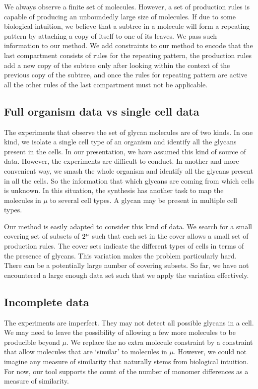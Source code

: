 We always observe a finite set of molecules. However,
a set of production rules is capable of producing
an unboundedly large size of molecules.
If due to some biological intuition, we believe that a subtree in a molecule
will form a repeating pattern by attaching a copy of itself to
one of its leaves.
We pass such information to our method.
We add constraints to our method to encode that
the last compartment consists of rules for the repeating pattern,
the production rules add a new copy of the subtree only after looking
within the context of the previous copy of the subtree,
and once the rules for repeating pattern are active
all the other rules of the last compartment must not be applicable. 

\subsection{Full organism data vs single cell data}

The experiments that observe the set of glycan molecules are of two kinds. In one kind, we isolate a single cell type of an organism and identify all the glycans present in the cells. In our presentation, we have assumed this kind of source of data. However, the experiments are difficult to conduct.
In another and more convenient way, we smash the whole organism and identify all the glycans present in all the cells.
So the information that which glycans are coming from which
cells is unknown.
In this situation, the synthesis has another task to map the molecules
in $\mu$ to several cell types.
A glycan may be present in multiple cell types.

Our method is easily adapted to consider this kind of data.
We search for a small covering set of subsets of
$2^{\mu}$ such that each set in the cover allows a small
set of production rules.
The cover sets indicate the different types of cells in terms of
the presence of glycans.
This variation makes the problem particularly hard.
There can be a potentially large number of covering subsets.
So far, we have not encountered a large enough data set such that
we apply the variation effectively. 


\subsection{Incomplete data}

The experiments are imperfect. They may not detect all possible glycans
in a cell.
We may need to leave the possibility of allowing a few more molecules to be
producible beyond $\mu$.
We replace the no extra molecule constraint by a constraint that allow molecules
that are `similar' to molecules in $\mu$.
However, we could not imagine any measure of similarity that naturally stems from
biological intuition.
For now, our tool supports the count of the number of monomer differences
as a measure of similarity.




